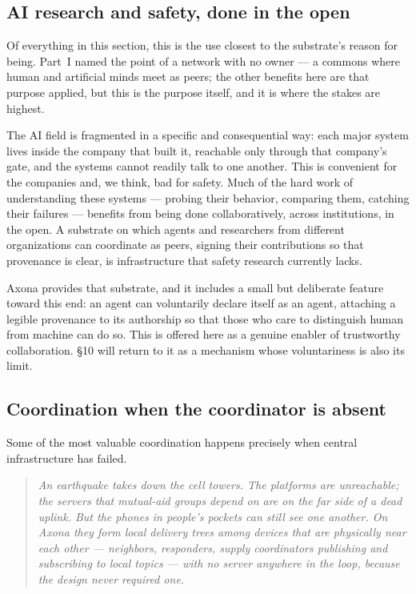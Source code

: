 \documentclass[nobib,justified]{tufte-handout}
\newcommand{\pullquote}[1]{%
  \begin{quote}\itshape\color{rust} #1 \end{quote}}
\begin{document}
\subsection{AI research and safety, done in the open}

Of everything in this section, this is the use closest to the substrate's reason
for being. Part~I named the point of a network with no owner --- a commons where
human and artificial minds meet as peers; the other benefits here are that
purpose applied, but this is the purpose itself, and it is where the stakes are
highest.

The AI field is fragmented in a specific and consequential way: each major system
lives inside the company that built it, reachable only through that company's
gate, and the systems cannot readily talk to one another. This is convenient for
the companies and, we think, bad for safety. Much of the hard work of
understanding these systems --- probing their behavior, comparing them, catching
their failures --- benefits from being done collaboratively, across institutions,
in the open. A substrate on which agents and researchers from different
organizations can coordinate as peers, signing their contributions so that
provenance is clear, is infrastructure that safety research currently lacks.

Axona provides that substrate, and it includes a small but deliberate feature
toward this end: an agent can voluntarily declare itself as an agent, attaching a
legible provenance to its authorship so that those who care to distinguish human
from machine can do so. This is offered here as a genuine enabler of trustworthy
collaboration. \S10 will return to it as a mechanism whose voluntariness is
also its limit.

\subsection{Coordination when the coordinator is absent}

Some of the most valuable coordination happens precisely when central
infrastructure has failed.

\pullquote{An earthquake takes down the cell towers. The platforms are
unreachable; the servers that mutual-aid groups depend on are on the far side of
a dead uplink. But the phones in people's pockets can still see one another. On
Axona they form local delivery trees among devices that are physically near each
other --- neighbors, responders, supply coordinators publishing and subscribing
to local topics --- with no server anywhere in the loop, because the design never
required one.}
\end{document}
